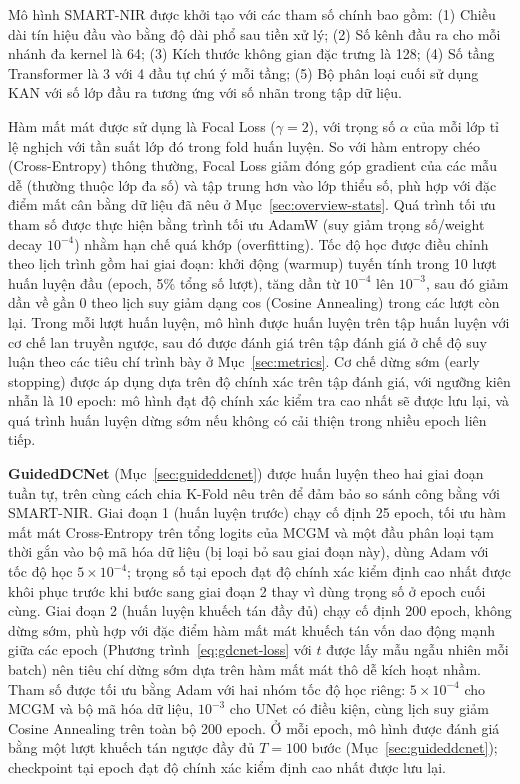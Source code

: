 \documentclass[10pt,twocolumn,twoside]{article}
\begin{document}
Mô hình SMART-NIR được khởi tạo với các tham số chính bao gồm: (1) Chiều dài
tín hiệu đầu vào bằng độ dài phổ sau tiền xử lý; (2) Số kênh đầu ra cho mỗi
nhánh đa kernel là 64; (3) Kích thước không gian đặc trưng là 128; (4) Số
tầng Transformer là 3 với 4 đầu tự chú ý mỗi tầng; (5) Bộ phân loại
cuối sử dụng KAN với số lớp đầu ra tương ứng với số nhãn trong tập dữ liệu.

Hàm mất mát được sử dụng là Focal Loss ($\gamma = 2$), với trọng số $\alpha$
của mỗi lớp tỉ lệ nghịch với tần suất lớp đó trong fold huấn luyện. So với
hàm entropy chéo (Cross-Entropy) thông thường, Focal Loss giảm đóng góp
gradient của các mẫu dễ (thường thuộc lớp đa số) và tập trung hơn vào lớp
thiểu số, phù hợp với đặc điểm mất cân bằng dữ liệu đã nêu ở
Mục~\ref{sec:overview-stats}. Quá trình tối ưu tham số được thực hiện bằng
trình tối ưu AdamW (suy giảm trọng số/weight decay $10^{-4}$) nhằm hạn chế
quá khớp (overfitting). Tốc độ học được điều chỉnh theo lịch trình gồm hai
giai đoạn: khởi động (warmup) tuyến tính trong 10 lượt huấn luyện đầu
(epoch, 5\% tổng số lượt), tăng dần từ $10^{-4}$ lên $10^{-3}$, sau đó giảm
dần về gần 0 theo lịch suy giảm dạng cos (Cosine Annealing) trong các lượt
còn lại. Trong mỗi lượt huấn luyện, mô hình được huấn luyện trên tập huấn
luyện với cơ chế lan truyền ngược, sau đó được đánh giá trên tập đánh giá ở
chế độ suy luận theo các tiêu chí trình bày ở Mục~\ref{sec:metrics}. Cơ chế
dừng sớm (early stopping) được áp dụng dựa trên độ chính xác trên tập đánh
giá, với ngưỡng kiên nhẫn là 10 epoch: mô hình đạt độ chính xác kiểm tra cao
nhất sẽ được lưu lại, và quá trình huấn luyện dừng sớm nếu không có cải
thiện trong nhiều epoch liên tiếp.

\textbf{GuidedDCNet} (Mục~\ref{sec:guideddcnet}) được huấn luyện theo hai
giai đoạn tuần tự, trên cùng cách chia K-Fold nêu trên để đảm bảo so sánh
công bằng với SMART-NIR. Giai đoạn 1 (huấn luyện trước) chạy cố định 25
epoch, tối ưu hàm mất mát Cross-Entropy trên tổng logits của MCGM và một
đầu phân loại tạm thời gắn vào bộ mã hóa dữ liệu (bị loại bỏ sau giai đoạn
này), dùng Adam với tốc độ học $5{\times}10^{-4}$; trọng số tại epoch đạt
độ chính xác kiểm định cao nhất được khôi phục trước khi bước sang giai
đoạn 2 thay vì dùng trọng số ở epoch cuối cùng. Giai đoạn 2 (huấn luyện
khuếch tán đầy đủ) chạy cố định 200 epoch, không dừng sớm, phù hợp với đặc
điểm hàm mất mát khuếch tán vốn dao động mạnh giữa các epoch (Phương
trình~\ref{eq:gdcnet-loss}
với $t$ được lấy mẫu ngẫu nhiên mỗi batch) nên tiêu chí dừng sớm dựa trên
hàm mất mát thô dễ kích hoạt nhầm. Tham số được tối ưu bằng Adam với hai
nhóm tốc độ học riêng: $5{\times}10^{-4}$ cho MCGM và bộ mã hóa dữ liệu,
$10^{-3}$ cho UNet có điều kiện, cùng lịch suy giảm Cosine Annealing trên
toàn bộ 200 epoch. Ở mỗi epoch, mô hình được đánh giá bằng một lượt khuếch
tán ngược đầy đủ $T=100$ bước (Mục~\ref{sec:guideddcnet}); checkpoint tại
epoch đạt độ chính xác kiểm định cao nhất được lưu lại.
\end{document}
